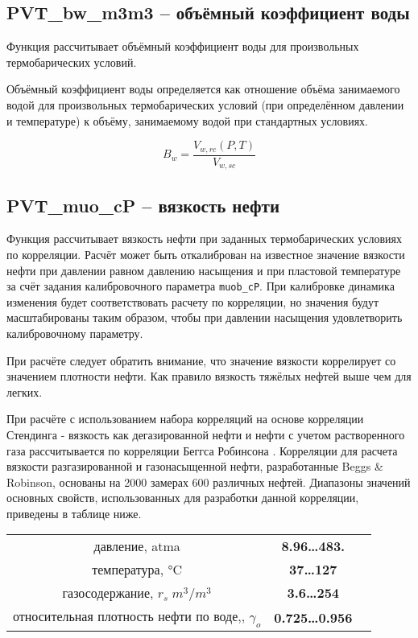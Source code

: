 \subsection{PVT\_bw\_m3m3 – объёмный коэффициент воды}
Функция рассчитывает объёмный коэффициент воды для произвольных термобарических условий. 

Объёмный коэффициент воды определяется как отношение объёма занимаемого водой для произвольных термобарических условий (при определённом давлении и температуре) к объёму, занимаемому водой при стандартных условиях. 

$$B_w = \frac{V_{w,rc}(P,T)}{V_{w,sc}}$$


\subsection{PVT\_muo\_cP – вязкость нефти}
Функция рассчитывает вязкость нефти при заданных термобарических условиях по корреляции. Расчёт может быть откалиброван на известное значение вязкости нефти при давлении равном давлению насыщения и при пластовой температуре за счёт задания калибровочного параметра \texttt{muob_cP}. При калибровке динамика изменения будет соответствовать расчету по корреляции, но значения будут масштабированы таким образом, чтобы при давлении насыщения удовлетворить калибровочному параметру.

При расчёте следует обратить внимание, что значение вязкости коррелирует со значением плотности нефти. Как правило вязкость тяжёлых нефтей выше чем для легких.

При расчёте с использованием набора корреляций на основе корреляции Стендинга - вязкость как дегазированной нефти и нефти с учетом растворенного газа рассчитывается по корреляции Беггса Робинсона \cite{Yukos_PVT_2002}. 
Корреляции для расчета вязкости разгазированной и газонасыщенной нефти, разработанные Beggs \& Robinson, основаны на 2000 замерах 600 различных нефтей.
Диапазоны значений основных свойств, использованных для разработки данной корреляции, приведены в таблице ниже.
\begin{center}
	\begin{tabular}{ccc}
		давление, atma & \textbf{8.96…483.} \\
		температура, °C & \textbf{37…127}  \\
		газосодержание, $r_s \; m^3 /m^3$ & \textbf{3.6…254}\\
		относительная плотность нефти по воде,, $\gamma_o$ & \textbf{0.725…0.956} \\
	\end{tabular}
\end{center}
   
